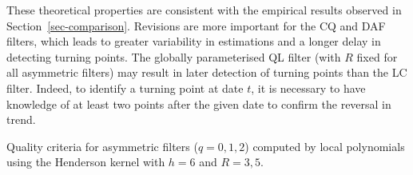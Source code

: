 \documentclass[
]{article}
\newcommand\1{\mathds{1}}
\begin{document}
These theoretical properties are consistent with the empirical results
observed in Section~\ref{sec-comparison}. Revisions are more important
for the CQ and DAF filters, which leads to greater variability in
estimations and a longer delay in detecting turning points. The globally
parameterised QL filter (with \(R\) fixed for all asymmetric filters)
may result in later detection of turning points than the LC filter.
Indeed, to identify a turning point at date \(t\), it is necessary to
have knowledge of at least two points after the given date to confirm
the reversal in trend.

\begin{table}

\caption{\label{tab-criteriaLp} Quality criteria for asymmetric filters ($q=0,1,2$) computed by local polynomials using the Henderson kernel with $h=6$ and $R=3,5$.}

\centering{

[!h]

}
\end{table}
\end{document}
